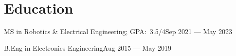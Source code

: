 \section{Education}
\resumeSubHeadingListStart{}

{MS in Robotics \& Electrical Engineering;  GPA:\ 3.5/4}{Sep 2021 --- May 2023}

{B.Eng in Electronics Engineering}{Aug 2015 --- May 2019}

\resumeSubHeadingListEnd{}{}{}
